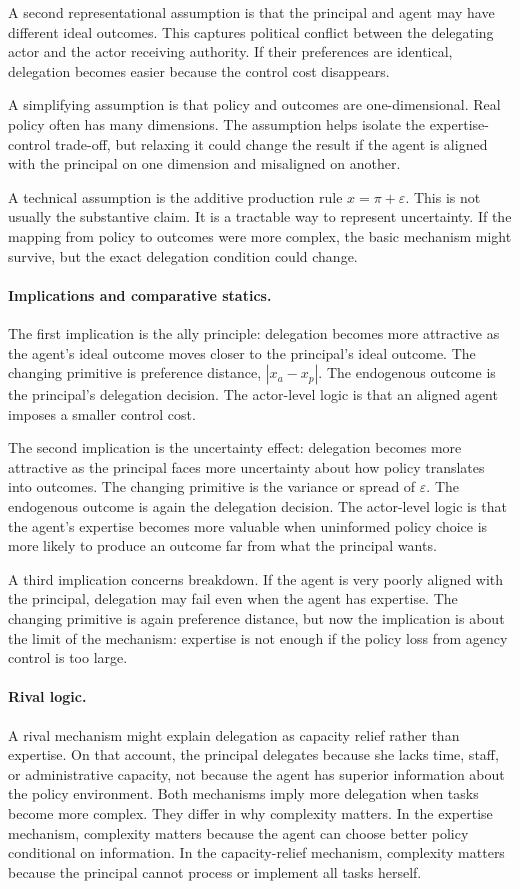 \documentclass[12pt]{article}
\begin{document}
A second representational assumption is that the principal and agent may have different ideal outcomes. This captures political conflict between the delegating actor and the actor receiving authority. If their preferences are identical, delegation becomes easier because the control cost disappears.

A simplifying assumption is that policy and outcomes are one-dimensional. Real policy often has many dimensions. The assumption helps isolate the expertise-control trade-off, but relaxing it could change the result if the agent is aligned with the principal on one dimension and misaligned on another.

A technical assumption is the additive production rule $x=\pi+\varepsilon$. This is not usually the substantive claim. It is a tractable way to represent uncertainty. If the mapping from policy to outcomes were more complex, the basic mechanism might survive, but the exact delegation condition could change.

\paragraph{Implications and comparative statics.}
The first implication is the ally principle: delegation becomes more attractive as the agent's ideal outcome moves closer to the principal's ideal outcome. The changing primitive is preference distance, $|x_a-x_p|$. The endogenous outcome is the principal's delegation decision. The actor-level logic is that an aligned agent imposes a smaller control cost.

The second implication is the uncertainty effect: delegation becomes more attractive as the principal faces more uncertainty about how policy translates into outcomes. The changing primitive is the variance or spread of $\varepsilon$. The endogenous outcome is again the delegation decision. The actor-level logic is that the agent's expertise becomes more valuable when uninformed policy choice is more likely to produce an outcome far from what the principal wants.

A third implication concerns breakdown. If the agent is very poorly aligned with the principal, delegation may fail even when the agent has expertise. The changing primitive is again preference distance, but now the implication is about the limit of the mechanism: expertise is not enough if the policy loss from agency control is too large.

\paragraph{Rival logic.}
A rival mechanism might explain delegation as capacity relief rather than expertise. On that account, the principal delegates because she lacks time, staff, or administrative capacity, not because the agent has superior information about the policy environment. Both mechanisms imply more delegation when tasks become more complex. They differ in why complexity matters. In the expertise mechanism, complexity matters because the agent can choose better policy conditional on information. In the capacity-relief mechanism, complexity matters because the principal cannot process or implement all tasks herself.
\end{document}
